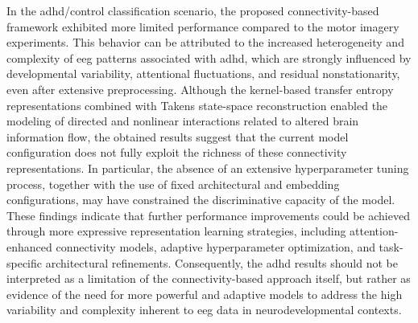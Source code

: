 In the \gls{adhd}/control classification scenario, the proposed connectivity-based framework exhibited more limited performance compared to the motor imagery experiments. This behavior can be attributed to the increased heterogeneity and complexity of \gls{eeg} patterns associated with \gls{adhd}, which are strongly influenced by developmental variability, attentional fluctuations, and residual nonstationarity, even after extensive preprocessing. Although the kernel-based transfer entropy representations combined with Takens state-space reconstruction enabled the modeling of directed and nonlinear interactions related to altered brain information flow, the obtained results suggest that the current model configuration does not fully exploit the richness of these connectivity representations. In particular, the absence of an extensive hyperparameter tuning process, together with the use of fixed architectural and embedding configurations, may have constrained the discriminative capacity of the model. These findings indicate that further performance improvements could be achieved through more expressive representation learning strategies, including attention-enhanced connectivity models, adaptive hyperparameter optimization, and task-specific architectural refinements. Consequently, the \gls{adhd} results should not be interpreted as a limitation of the connectivity-based approach itself, but rather as evidence of the need for more powerful and adaptive models to address the high variability and complexity inherent to \gls{eeg} data in neurodevelopmental contexts.

